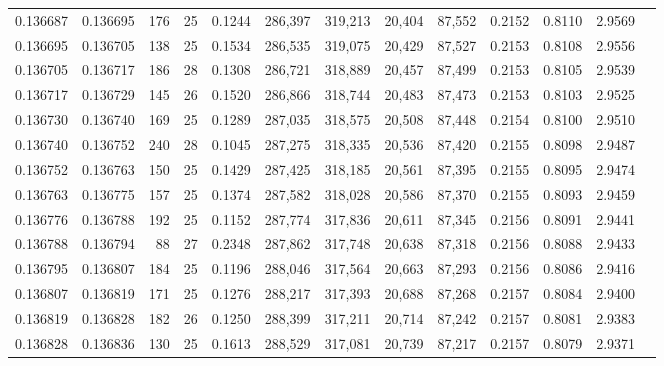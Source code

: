 \begin{tabular}{rrrrrrrrrrrrr}
0.136687 & 0.136695 &   176 &  25 &                                     0.1244 & 286,397 & 319,213 &  20,404 &  87,552 & 0.2152 & 0.8110 & 2.9569 \\
0.136695 & 0.136705 &   138 &  25 &                                     0.1534 & 286,535 & 319,075 &  20,429 &  87,527 & 0.2153 & 0.8108 & 2.9556 \\
0.136705 & 0.136717 &   186 &  28 &                                     0.1308 & 286,721 & 318,889 &  20,457 &  87,499 & 0.2153 & 0.8105 & 2.9539 \\
0.136717 & 0.136729 &   145 &  26 &                                     0.1520 & 286,866 & 318,744 &  20,483 &  87,473 & 0.2153 & 0.8103 & 2.9525 \\
0.136730 & 0.136740 &   169 &  25 &                                     0.1289 & 287,035 & 318,575 &  20,508 &  87,448 & 0.2154 & 0.8100 & 2.9510 \\
0.136740 & 0.136752 &   240 &  28 &                                     0.1045 & 287,275 & 318,335 &  20,536 &  87,420 & 0.2155 & 0.8098 & 2.9487 \\
0.136752 & 0.136763 &   150 &  25 &                                     0.1429 & 287,425 & 318,185 &  20,561 &  87,395 & 0.2155 & 0.8095 & 2.9474 \\
0.136763 & 0.136775 &   157 &  25 &                                     0.1374 & 287,582 & 318,028 &  20,586 &  87,370 & 0.2155 & 0.8093 & 2.9459 \\
0.136776 & 0.136788 &   192 &  25 &                                     0.1152 & 287,774 & 317,836 &  20,611 &  87,345 & 0.2156 & 0.8091 & 2.9441 \\
0.136788 & 0.136794 &    88 &  27 &                                     0.2348 & 287,862 & 317,748 &  20,638 &  87,318 & 0.2156 & 0.8088 & 2.9433 \\
0.136795 & 0.136807 &   184 &  25 &                                     0.1196 & 288,046 & 317,564 &  20,663 &  87,293 & 0.2156 & 0.8086 & 2.9416 \\
0.136807 & 0.136819 &   171 &  25 &                                     0.1276 & 288,217 & 317,393 &  20,688 &  87,268 & 0.2157 & 0.8084 & 2.9400 \\
0.136819 & 0.136828 &   182 &  26 &                                     0.1250 & 288,399 & 317,211 &  20,714 &  87,242 & 0.2157 & 0.8081 & 2.9383 \\
0.136828 & 0.136836 &   130 &  25 &                                     0.1613 & 288,529 & 317,081 &  20,739 &  87,217 & 0.2157 & 0.8079 & 2.9371 \\

\end{tabular}
